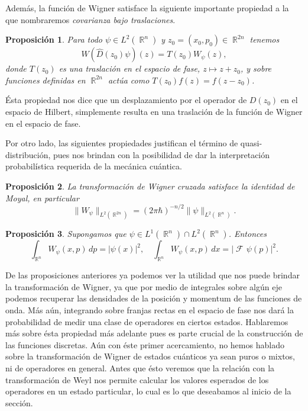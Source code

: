 \documentclass[a4paper]{report}
\DeclareMathOperator{\R}{\mathbb{R}}
\DeclareMathOperator{\Fr}{\mathcal{F}\!}
\newtheorem{proposition}{Proposición}
\begin{document}
  Además, la función de Wigner satisface la siguiente
  importante propiedad a la que nombraremos
  \textit{covarianza bajo traslaciones}. 
  \begin{proposition}
    Para todo $\psi \in L^2(\R^{n})$ y $z_0 = (x_0,p_0) \in
    \R^{2n}$ tenemos
    \begin{equation}
      W(\hat{D}(z_0)\psi)(z)
      = T(z_0)W_\psi(z),
    \end{equation} 
    donde $T(z_0)$ es una traslación en el espacio de fase,
    $z \mapsto z + z_0$, y sobre funciones definidas en
    $\R^{2n}$ actúa como $T(z_0)f(z) = f(z-z_0)$.
  \end{proposition}
  Ésta propiedad nos dice que un desplazamiento por el
  operador de $D(z_0)$ en el espacio de Hilbert, simplemente
  resulta en una traslación de la función de Wigner en el
  espacio de fase.

  Por otro lado, las siguientes propiedades justifican el
  término de quasi-distribución, pues nos brindan con la
  posibilidad de dar la interpretación probabilística
  requerida de la mecánica cuántica.
  \begin{proposition}
    La transformación de Wigner cruzada satisface la
    identidad de Moyal, en particular
    \begin{equation}
      \|W_\psi\|_{L^2(\R^{2n})}
      = (2\pi\hbar)^{-n / 2} \|\psi\|_{L^2(\R^{n})}.
    \end{equation}
  \end{proposition}
  \begin{proposition}
    Supongamos que $\psi \in L^{1}(\R^{n}) \cap
    L^2(\R^{n})$. Entonces
    \begin{equation}
      \int_{\R^{n}} W_\psi(x,p) \, dp
      = |\psi(x)|^2,
      \quad
      \int_{\R^{n}} W_\psi(x,p) \, dx
      = |\Fr\psi(p)|^2.
    \end{equation}
  \end{proposition}
  De las proposiciones anteriores ya podemos ver la utilidad
  que nos puede brindar la transformación de Wigner, ya que
  por medio de integrales sobre algún eje podemos recuperar
  las densidades de la posición y momentum de las funciones
  de onda. Más aún, integrando sobre franjas rectas en el
  espacio de fase nos dará la probabilidad de medir una
  clase de operadores en ciertos estados. Hablaremos más
  sobre ésta propiedad más adelante pues es parte crucial de
  la construcción de las funciones discretas. Aún con éste
  primer acercamiento, no hemos hablado sobre la
  transformación de Wigner de estados cuánticos ya sean
  puros o mixtos, ni de operadores en general.  Antes que
  ésto veremos que la relación con la transformación de Weyl
  nos permite calcular los valores esperados de los
  operadores en un estado particular, lo cual es lo que
  deseabamos al inicio de la sección.
  
\end{document}
